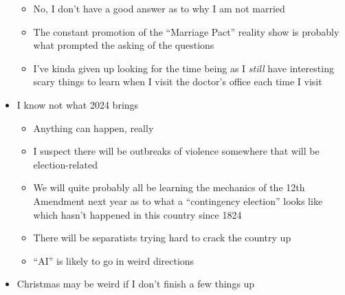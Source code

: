 \begin{itemize}
  \begin{itemize}
  \tightlist
  \item
    No, I don't have a good answer as to why I am not married
  \item
    The constant promotion of the ``Marriage Pact'' reality show is
    probably what prompted the asking of the questions
  \item
    I've kinda given up looking for the time being as I \emph{still}
    have interesting scary things to learn when I visit the doctor's
    office each time I visit
  \end{itemize}
\item
  I know not what 2024 brings

  \begin{itemize}
  \tightlist
  \item
    Anything can happen, really
  \item
    I suspect there will be outbreaks of violence somewhere that will be
    election-related
  \item
    We will quite probably all be learning the mechanics of the 12th
    Amendment next year as to what a ``contingency election'' looks like
    which hasn't happened in this country since 1824
  \item
    There will be separatists trying hard to crack the country up
  \item
    ``AI'' is likely to go in weird directions
  \end{itemize}
\item
  Christmas may be weird if I don't finish a few things up
\end{itemize}
